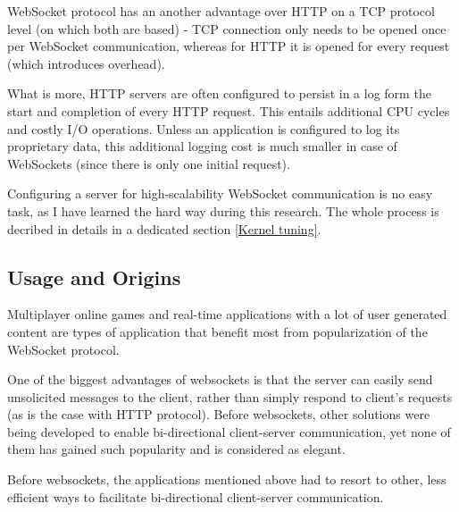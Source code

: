 \documentclass{uvamscse}
\begin{document}
WebSocket protocol has an another advantage over HTTP on a TCP protocol level (on which both are based) - TCP connection only needs to be opened once per WebSocket communication, whereas for HTTP it is opened for every request (which introduces overhead).

What is more, HTTP servers are often configured to persist in a log form the start and completion of every HTTP request. This entails additional CPU cycles and costly I/O operations. Unless an application is configured to log its proprietary data, this additional logging cost is much smaller in case of WebSockets (since there is only one initial request).

Configuring a server for high-scalability WebSocket communication is no easy task, as I have learned the hard way during this research. The whole process is decribed in details in a dedicated section \ref{Kernel tuning}.

\subsection{Usage and Origins}\label{Client-Server Communication Improvements}

Multiplayer online games and real-time applications with a lot of user generated content are types of application that benefit most from popularization of the WebSocket protocol.

One of the biggest advantages of websockets is that the server can easily send unsolicited messages to the client, rather than simply respond to client's requests (as is the case with HTTP protocol). Before websockets, other solutions were being developed to enable bi-directional client-server communication, yet none of them has gained such popularity and is considered as elegant.

Before websockets, the applications mentioned above had to resort to other, less efficient ways to facilitate bi-directional client-server communication.
\end{document}
